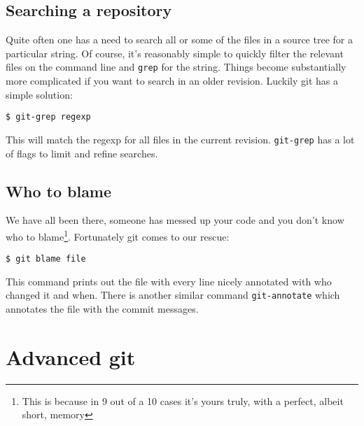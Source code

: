 \documentclass[a4paper,10pt]{article}
\begin{document}
\subsection{Searching a repository}
Quite often one has a need to search all or some of the files in a source
tree for a particular string. Of course, it's reasonably simple to quickly
filter the relevant files on the command line and \texttt{grep} for the
string. Things become substantially more complicated if you want to search in 
an older revision. Luckily git has a simple solution:
\begin{verbatim}
$ git-grep regexp 
\end{verbatim}
This will match the regexp for all files in the current revision.
\texttt{git-grep} has a lot of flags to limit and refine searches.


\subsection{Who to blame}
We have all been there, someone has messed up your code and you don't know who
to blame\footnote{This is because in 9 out of a 10 cases it's yours truly,
with a perfect, albeit short, memory}.
Fortunately git comes to our rescue:
\begin{verbatim}
$ git blame file
\end{verbatim}
This command prints out the file with every line nicely annotated with who 
changed it and when. There is another similar command \texttt{git-annotate}
which annotates the file with the commit messages. 

\section{Advanced git}
\end{document}
